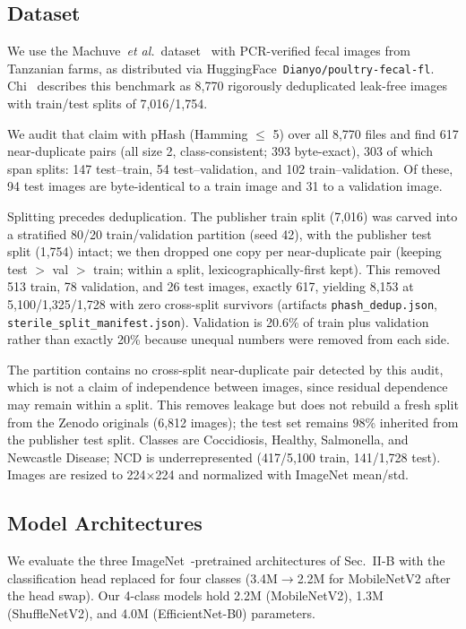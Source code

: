 \documentclass[conference,a4paper]{IEEEtran}
\begin{document}
\subsection{Dataset}
We use the Machuve~\textit{et al.}~dataset~\cite{machuve22} with PCR-verified fecal images from Tanzanian farms, as distributed via HuggingFace~\texttt{Dianyo/poultry-fecal-fl}. Chi~\cite{chi2026} describes this benchmark as 8,770 rigorously deduplicated leak-free images with train/test splits of 7,016/1,754.

We audit that claim with pHash (Hamming $\le$ 5) over all 8,770 files and find 617 near-duplicate pairs (all size 2, class-consistent; 393 byte-exact), 303 of which span splits: 147 test--train, 54 test--validation, and 102 train--validation. Of these, 94 test images are byte-identical to a train image and 31 to a validation image.

Splitting precedes deduplication. The publisher train split (7,016) was carved into a stratified 80/20 train/validation partition (seed 42), with the publisher test split (1,754) intact; we then dropped one copy per near-duplicate pair (keeping test $>$ val $>$ train; within a split, lexicographically-first kept). This removed 513 train, 78 validation, and 26 test images, exactly 617, yielding 8,153 at 5,100/1,325/1,728 with zero cross-split survivors (artifacts \texttt{phash\_dedup.json}, \texttt{sterile\_split\_manifest.json}). Validation is 20.6\% of train plus validation rather than exactly 20\% because unequal numbers were removed from each side.

The partition contains no cross-split near-duplicate pair detected by this audit, which is not a claim of independence between images, since residual dependence may remain within a split. This removes leakage but does not rebuild a fresh split from the Zenodo originals (6,812 images); the test set remains 98\% inherited from the publisher test split. Classes are Coccidiosis, Healthy, Salmonella, and Newcastle Disease; NCD is underrepresented (417/5,100 train, 141/1,728 test). Images are resized to 224$\times$224 and normalized with ImageNet mean/std.

\subsection{Model Architectures}
We evaluate the three ImageNet~\cite{deng2009}-pretrained architectures of Sec.~II-B with the classification head replaced for four classes (3.4M$\rightarrow$2.2M for MobileNetV2 after the head swap). Our 4-class models hold 2.2M (MobileNetV2), 1.3M (ShuffleNetV2), and 4.0M (EfficientNet-B0) parameters.
\end{document}
